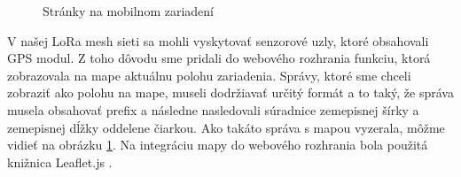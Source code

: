 \documentclass[slovak,master]{diploma}
\begin{document}
\newpage
\begin{figure}[h!]
  \begin{center}
  \end{center}
  \caption{Stránky na mobilnom zariadení}
  \label{fig:mobileWeb}
\end{figure}

V našej LoRa mesh sieti sa mohli vyskytovať senzorové uzly, ktoré obsahovali GPS modul. Z toho dôvodu sme pridali do webového rozhrania funkciu, 
ktorá zobrazovala na mape aktuálnu polohu zariadenia. Správy, ktoré sme chceli zobraziť ako polohu na mape, museli dodržiavať určitý formát 
a to taký, že správa musela obsahovať prefix  a následne nasledovali súradnice zemepisnej šírky a zemepisnej dĺžky oddelene čiarkou.
Ako takáto správa s mapou vyzerala, môžme vidieť na obrázku \ref{fig:mobileWeb}. Na integráciu mapy do webového rozhrania bola použitá knižnica Leaflet.js \cite{leaflet}.
\end{document}

